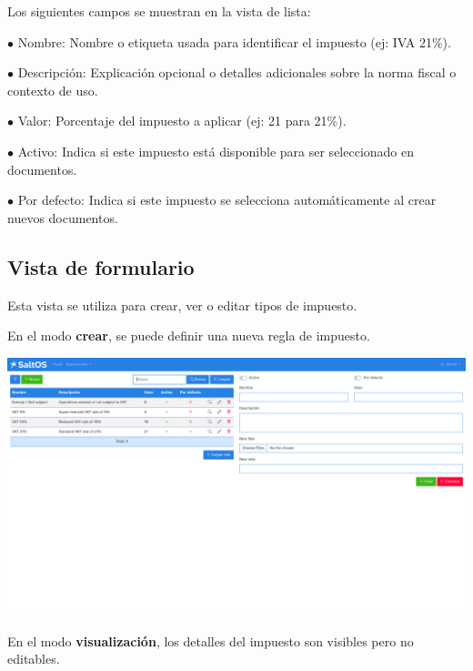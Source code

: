 \documentclass[a4paper]{article}
\begin{document}
Los siguientes campos se muestran en la vista de lista:

\begin{compactitem}
\item[\color{myblue}$\bullet$] Nombre: Nombre o etiqueta usada para identificar el impuesto (ej: IVA 21\%).
\item[\color{myblue}$\bullet$] Descripción: Explicación opcional o detalles adicionales sobre la norma fiscal o contexto de uso.
\item[\color{myblue}$\bullet$] Valor: Porcentaje del impuesto a aplicar (ej: 21 para 21\%).
\item[\color{myblue}$\bullet$] Activo: Indica si este impuesto está disponible para ser seleccionado en documentos.
\item[\color{myblue}$\bullet$] Por defecto: Indica si este impuesto se selecciona automáticamente al crear nuevos documentos.
\end{compactitem}

\hypertarget{toc169}{}
\subsection{Vista de formulario}

Esta vista se utiliza para crear, ver o editar tipos de impuesto.

En el modo \textbf{crear}, se puede definir una nueva regla de impuesto.

\begin{center}\includegraphics[width=1\textwidth]{../ujest/snaps/test-screenshots-js-screenshots-sales-taxes-create-es-es-1-snap.png}\end{center}

En el modo \textbf{visualización}, los detalles del impuesto son visibles pero no editables.
\end{document}
